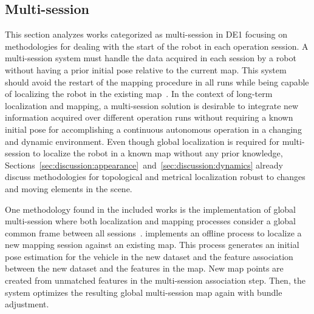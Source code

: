 \subsection{Multi-session}
\label{sec:discussion:multisession}

This section analyzes works categorized as multi-session in DE1 focusing on methodologies for dealing with the start of the robot in each operation session. A multi-session system must handle the data acquired in each session by a robot without having a prior initial pose relative to the current map. This system should avoid the restart of the mapping procedure in all runs while being capable of localizing the robot in the existing map~\parencite{labbé-michaud:2019:21831}.
In the context of long-term localization and mapping, a multi-session solution is desirable to integrate new information acquired over different operation runs without requiring a known initial pose for accomplishing a continuous autonomous operation in a changing and dynamic environment.
Even though global localization is required for multi-session to localize the robot in a known map without any prior knowledge, Sections~\ref{sec:discussion:appearance}~and~\ref{sec:discussion:dynamics} already discuss methodologies for topological and metrical localization robust to changes and moving elements in the scene.

One methodology found in the included works is the implementation of global multi-session where both localization and mapping processes consider a global common frame between all sessions~\parencite{ozog-et-al:2016:21582}.
\cite{bürki-et-al:2019:21870} implements an offline process to localize a new mapping session against an existing map. This process generates an initial pose estimation for the vehicle in the new dataset and the feature association between the new dataset and the features in the map. New map points are created from unmatched features in the multi-session association step. Then, the system optimizes the resulting global multi-session map again with bundle adjustment.

